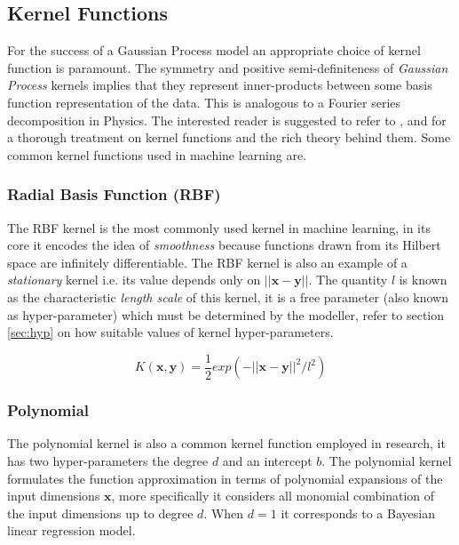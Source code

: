 \documentclass[referee,a4paper,12pt,traditabstract]{swsc}
\begin{document}
\begin{linenumbers}
\subsection{Kernel Functions}

For the success of a Gaussian Process model an appropriate choice of kernel function is paramount. The symmetry and positive semi-definiteness of \emph{Gaussian Process} kernels implies that they represent inner-products between some basis function representation of the data. This is analogous to a Fourier series decomposition in Physics. The interested reader is suggested to refer to \cite{Berlinet2004}, \citet{Scholkopf:2001:LKS:559923} and \citet{hofmann2008} for a thorough treatment on kernel functions and the rich theory behind them. Some common kernel functions used in machine learning are.

\subsubsection{Radial Basis Function (RBF)}

The RBF kernel is the most commonly used kernel in machine learning, in its core it encodes the idea of \emph{smoothness} because functions drawn from its Hilbert space are infinitely differentiable. The RBF kernel is also an example of a \emph{stationary} kernel i.e. its value depends only on $||\mathbf{x} - \mathbf{y}||$. The quantity $l$ is known as the characteristic \emph{length scale} of this kernel, it is a free parameter (also known as hyper-parameter) which must be determined by the modeller, refer to section \ref{sec:hyp} on how suitable values of kernel hyper-parameters.

\begin{equation}
    K(\mathbf{x}, \mathbf{y}) = \frac{1}{2} exp(-||\mathbf{x} - \mathbf{y}||^2/l^2)
\end{equation}
    
    
\subsubsection{Polynomial}

The polynomial kernel is also a common kernel function employed in research, it has two hyper-parameters the degree $d$ and an intercept $b$. The polynomial kernel formulates the function approximation in terms of polynomial expansions of the input dimensions $\mathbf{x}$, more specifically it considers all monomial combination of the input dimensions up to degree $d$. When $d = 1$ it corresponds to a Bayesian linear regression model. 


\end{linenumbers}
\end{document}
